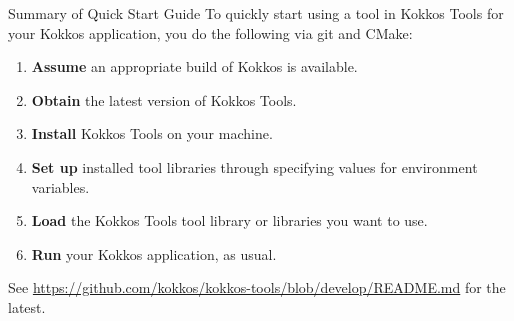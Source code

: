 \begin{frame}[fragile]{Summary of Quick Start Guide}
To quickly start using a tool in Kokkos Tools for your Kokkos application, you do the following via git and CMake:
\begin{enumerate}
\item \textbf{Assume} an appropriate build of Kokkos is available.
\item \textbf{Obtain} the latest version of Kokkos Tools.
\item \textbf{Install} Kokkos Tools on your machine.
\item \textbf{Set up} installed tool libraries through specifying values for environment variables.
\item \textbf{Load} the Kokkos Tools tool library or libraries you want to use.
\item \textbf{Run} your Kokkos application, as usual.
\end{enumerate}

\begin{center}
\small See \url{https://github.com/kokkos/kokkos-tools/blob/develop/README.md}
for the latest. 
\end{center}

\end{frame}


